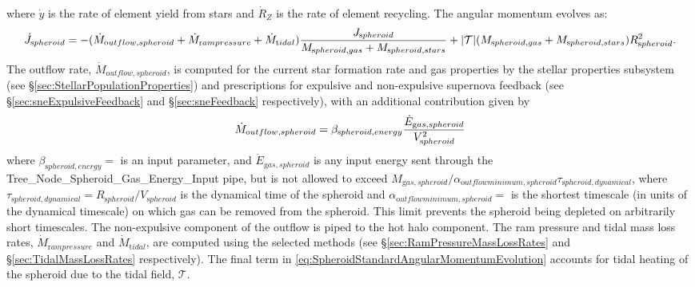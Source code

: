 where $\dot{y}$ is the rate of element yield from stars and $\dot{R}_Z$ is the rate of element recycling. The angular momentum evolves as:
\begin{equation}
 \dot{J}_{\mathrm spheroid} = - (\dot{M}_{\mathrm outflow, spheroid} + \dot{M}_{\mathrm ram pressure}+\dot{M}_{\mathrm tidal}) {J_{\mathrm spheroid} \over M_{\mathrm spheroid, gas} + M_{\mathrm spheroid, stars}} + |\mathcal{T}| ( M_{\mathrm spheroid, gas} + M_{\mathrm spheroid, stars} ) R_{\mathrm spheroid}^2.
 \label{eq:SpheroidStandardAngularMomentumEvolution}
\end{equation}
The outflow rate, $\dot{M}_{\mathrm outflow, spheroid}$, is computed for the current star formation rate and gas properties by the stellar properties subsystem (see \S\ref{sec:StellarPopulationProperties}) and prescriptions for expulsive and non-expulsive supernova feedback (see \S\ref{sec:sneExpulsiveFeedback} and \S\ref{sec:sneFeedback} respectively), with an additional contribution given by
\begin{equation}
 \dot{M}_{\mathrm outflow, spheroid} = \beta_{\mathrm spheroid, energy} {\dot{E}_{\mathrm gas, spheroid} \over V_{\mathrm spheroid}^2}
\end{equation}
where $\beta_{\mathrm spheroid, energy}=${\normalfont \ttfamily [spheroidEnergeticOutflowMassRate]} is an input parameter, and $\dot{E}_{\mathrm gas,spheroid}$ is any input energy sent through the {\normalfont \ttfamily Tree\_Node\_Spheroid\_Gas\_Energy\_Input} pipe, but is not allowed to exceed $M_{\mathrm gas, spheroid}/ \alpha_{\mathrm outflow minimum, spheroid} \tau_{\mathrm spheroid, dynamical}$, where $\tau_{\mathrm spheroid, dynamical}=R_{\mathrm spheroid}/V_{\mathrm spheroid}$ is the dynamical time of the spheroid and $\alpha_{\mathrm outflow minimum, spheroid}=${\normalfont \ttfamily [spheroidOutflowTimescaleMinimum]} is the shortest timescale (in units of the dynamical timescale) on which gas can be removed from the spheroid. This limit prevents the spheroid being depleted on arbitrarily short timescales. The non-expulsive \gls{component} of the outflow is piped to the hot halo component. The ram pressure and tidal mass loss rates, $\dot{M}_{\mathrm ram pressure}$ and $\dot{M}_{\mathrm tidal}$, are computed using the selected methods (see \S\ref{sec:RamPressureMassLossRates} and \S\ref{sec:TidalMassLossRates} respectively). The final term in \ref{eq:SpheroidStandardAngularMomentumEvolution} accounts for tidal heating of the spheroid due to the tidal field, $\mathcal{T}$.


